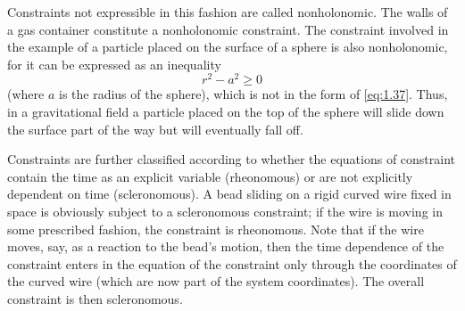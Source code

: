 Constraints not expressible in this fashion are called nonholonomic. The walls of a gas container constitute a nonholonomic constraint. The constraint involved in the example of a particle placed on the surface of a sphere is also nonholonomic, for it can be expressed as an inequality
\begin{equation*}
    r^2-a^2\geqslant0
\end{equation*}
(where \(a\) is the radius of the sphere), which is not in the form of \eqref{eq:1.37}. Thus, in a gravitational field a particle placed on the top of the sphere will slide down the surface part of the way but will eventually fall off.

Constraints are further classified according to whether the equations of constraint contain the time as an explicit variable (rheonomous) or are not explicitly dependent on time (scleronomous). A bead sliding on a rigid curved wire fixed in space is obviously subject to a scleronomous constraint; if the wire is moving in some prescribed fashion, the constraint is rheonomous. Note that if the wire moves, say, as a reaction to the bead's motion, then the time dependence of the constraint enters in the equation of the constraint only through the coordinates of the curved wire (which are now part of the system coordinates). The overall constraint is then scleronomous.

